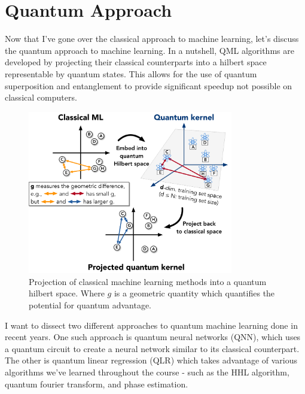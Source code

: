 \documentclass[12pt]{article}
\begin{document}
\begin{itemize}
\end{itemize}

\section*{Quantum Approach}
Now that I've gone over the classical approach to machine learning, let's discuss the quantum approach to machine learning. In a nutshell, QML algorithms are developed by projecting their classical counterparts into a hilbert space representable by quantum states. This allows for the use of quantum superposition and entanglement to provide significant speedup not possible on classical computers.

\begin{figure}[h]
\centering
\includegraphics[width=0.8\textwidth]{QuantumKernel.png}
\caption{Projection of classical machine learning methods into a quantum hilbert space. Where $g$ is a geometric quantity which quantifies the potential for quantum advantage.\cite{mcclean_huang_2021}}
\end{figure}

I want to dissect two different approaches to quantum machine learning done in recent years. One such approach is quantum neural networks (QNN), which uses a quantum circuit to create a neural network similar to its classical counterpart. The other is quantum linear regression (QLR) which takes advantage of various algorithms we've learned throughout the course - such as the HHL algorithm, quantum fourier transform, and phase estimation.
\end{document}
